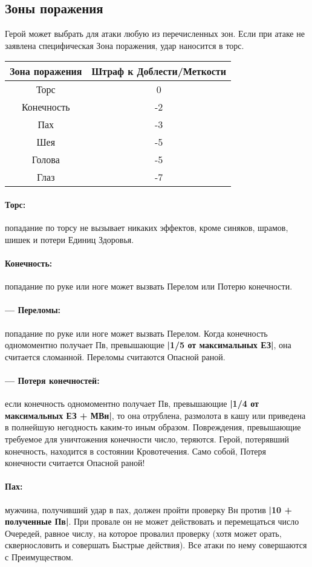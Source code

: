 \subsection{Зоны поражения}
Герой может выбрать для атаки любую из перечисленных зон. Если при атаке не заявлена специфическая Зона поражения, удар наносится в торс.
\begin{center}
\begin{tabular}{|c|c|}
\hline
Зона поражения & Штраф к Доблести/Меткости \\ \hline
Торс & 0 \\ \hline
Конечность & -2 \\ \hline
Пах & -3 \\ \hline
Шея & -5 \\ \hline
Голова & -5 \\ \hline
Глаз & -7 \\ \hline
\end{tabular}
\end{center}
\paragraph{Торс:} попадание по торсу не вызывает никаких эффектов, кроме синяков, шрамов, шишек и потери Единиц Здоровья.
\paragraph{Конечность:} попадание по руке или ноге может вызвать Перелом или Потерю конечности.
\paragraph{— Переломы:} попадание по руке или ноге может вызвать Перелом. Когда конечность одномоментно получает Пв, превышающие \textbf{|1/5 от максимальных ЕЗ|}, она считается сломанной. Переломы считаются Опасной раной.
\paragraph{— Потеря конечностей:} если конечность одномоментно получает Пв, превышающие \textbf{|1/4 от максимальных ЕЗ + МВн|}, то она отрублена, размолота в кашу или приведена в полнейшую негодность каким-то иным образом. Повреждения, превышающие требуемое для уничтожения конечности число, теряются. Герой, потерявший конечность, находится в состоянии Кровотечения. Само собой, Потеря конечности считается Опасной раной!
\paragraph{Пах:} мужчина, получивший удар в пах, должен пройти проверку Вн против \textbf{|10 + полученные Пв|}. При провале он не может действовать и перемещаться число Очередей, равное числу, на которое провалил проверку (хотя может орать, сквернословить и совершать Быстрые действия). Все атаки по нему совершаются с Преимуществом.
